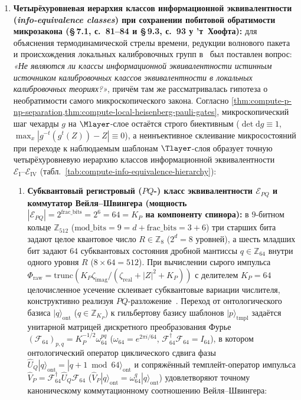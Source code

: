 \begin{enumerate}[leftmargin=*]
\item \textbf{Четырёхуровневая иерархия классов информационной эквивалентности (\emph{info-equivalence classes}) при сохранении побитовой обратимости микрозакона (\S\,7.1, с.~81--84 и \S\,9.3, с.~93 у ’т~Хоофта):}
  для объяснения термодинамической стрелы времени, редукции волнового пакета и происхождения локальных калибровочных групп в~\textcite[\S\,7.1, с.~82, рис.~7--8]{tHooft2016} был поставлен вопрос: \emph{«Не являются ли классы информационной эквивалентности истинным источником калибровочных классов эквивалентности в локальных калибровочных теориях?»}, причём там же рассматривалась гипотеза о необратимости самого микроскопического закона.
  Согласно \cref{thm:compute-p-np-separation,thm:compute-local-heisenberg-pauli-gates}, микроскопический шаг чехарды $g$ на $\Mlayer$-слое остаётся строго биективным ($\det\mathrm{d}g \equiv 1$, $\max_x|g^{-t}(g^t(Z)) - Z| \equiv 0$), а неинъективное склеивание микросостояний при переходе к наблюдаемым шаблонам $\Tlayer$-слоя образует точную четырёхуровневую иерархию классов информационной эквивалентности $\mathcal{E}_{\mathrm{I}}\text{--}\mathcal{E}_{\mathrm{IV}}$ (табл.~\ref{tab:compute-info-equivalence-hierarchy}):
  \begin{enumerate}[label=\textbf{Уровень~\Roman*.},leftmargin=*]
  \item \textbf{Субквантовый регистровый ($PQ$-) класс эквивалентности $\mathcal{E}_{PQ}$ и коммутатор Вейля--Швингера (мощность $|\mathcal{E}_{PQ}| = 2^{\mathrm{frac\_bits}} = 2^6 = 64 = K_P$ на компоненту спинора):}
    в $9$-битном кольце $\mathbb{Z}_{512}$ ($\mathrm{mod\_bits} = 9 = d + \mathrm{frac\_bits} = 3 + 6$) три старших бита задают целое квантовое число $R \in \mathbb{Z}_8$ ($2^d = 8$ уровней), а шесть младших бит задают $64$ субквантовых состояния дробной мантиссы $q \in \mathbb{Z}_{64}$ внутри одного уровня $R$ ($8\times 64 = 512$).
    При вычислении сырого импульса $\Phi_{\mathrm{raw}} = \mathrm{trunc}\!\left(K_P\zeta_{\mathrm{imag}}/(\zeta_{\mathrm{real}} + |Z|^2 + K_P)\right)$ с делителем $K_P = 64$ целочисленное усечение склеивает субквантовые вариации числителя, конструктивно реализуя $PQ$-разложение~\textcite[\S\,16, с.~147]{tHooft2016}.
    Переход от онтологического базиса $|q\rangle_{\mathrm{ont}}$ ($q \in \mathbb{Z}_{K_P}$) к гильбертову базису шаблонов $|p\rangle_{\mathrm{tmpl}}$ задаётся унитарной матрицей дискретного преобразования Фурье $(\mathcal{F}_{64})_{p,q} = K_P^{-1/2}\omega_{64}^{p q}$ ($\omega_{64} = e^{2\pi i / 64}$, $\mathcal{F}_{64}^\dagger\mathcal{F}_{64} = I_{64}$), в котором онтологический оператор циклического сдвига фазы $\hat{U}_Q|q\rangle_{\mathrm{ont}} = |q+1\bmod 64\rangle_{\mathrm{ont}}$ и сопряжённый темплейт-оператор импульса $\hat{V}_P = \mathcal{F}_{64}^\dagger \hat{U}_Q \mathcal{F}_{64}$ ($\hat{V}_P|q\rangle_{\mathrm{ont}} = \omega_{64}^q|q\rangle_{\mathrm{ont}}$) удовлетворяют точному каноническому коммутационному соотношению Вейля--Швингера:

\end{enumerate}
\end{enumerate}
